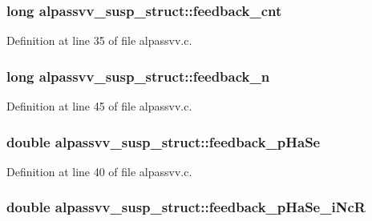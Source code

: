 \subsubsection[{\texorpdfstring{feedback\+\_\+cnt}{feedback_cnt}}]{\setlength{\rightskip}{0pt plus 5cm}long alpassvv\+\_\+susp\+\_\+struct\+::feedback\+\_\+cnt}\hypertarget{structalpassvv__susp__struct_aaee2cbe000eba08e5ed73789c47cec7b}{}\label{structalpassvv__susp__struct_aaee2cbe000eba08e5ed73789c47cec7b}


Definition at line 35 of file alpassvv.\+c.

\subsubsection[{\texorpdfstring{feedback\+\_\+n}{feedback_n}}]{\setlength{\rightskip}{0pt plus 5cm}long alpassvv\+\_\+susp\+\_\+struct\+::feedback\+\_\+n}\hypertarget{structalpassvv__susp__struct_a2c0ac71bb0240adcf8c67793a8cd444c}{}\label{structalpassvv__susp__struct_a2c0ac71bb0240adcf8c67793a8cd444c}


Definition at line 45 of file alpassvv.\+c.

\subsubsection[{\texorpdfstring{feedback\+\_\+p\+Ha\+Se}{feedback_pHaSe}}]{\setlength{\rightskip}{0pt plus 5cm}double alpassvv\+\_\+susp\+\_\+struct\+::feedback\+\_\+p\+Ha\+Se}\hypertarget{structalpassvv__susp__struct_a58336182ef009478c15c413ba46d8594}{}\label{structalpassvv__susp__struct_a58336182ef009478c15c413ba46d8594}


Definition at line 40 of file alpassvv.\+c.

\subsubsection[{\texorpdfstring{feedback\+\_\+p\+Ha\+Se\+\_\+i\+NcR}{feedback_pHaSe_iNcR}}]{\setlength{\rightskip}{0pt plus 5cm}double alpassvv\+\_\+susp\+\_\+struct\+::feedback\+\_\+p\+Ha\+Se\+\_\+i\+NcR}\hypertarget{structalpassvv__susp__struct_a29371b68e8634d9de7c3d5313edbbcda}{}\label{structalpassvv__susp__struct_a29371b68e8634d9de7c3d5313edbbcda}



